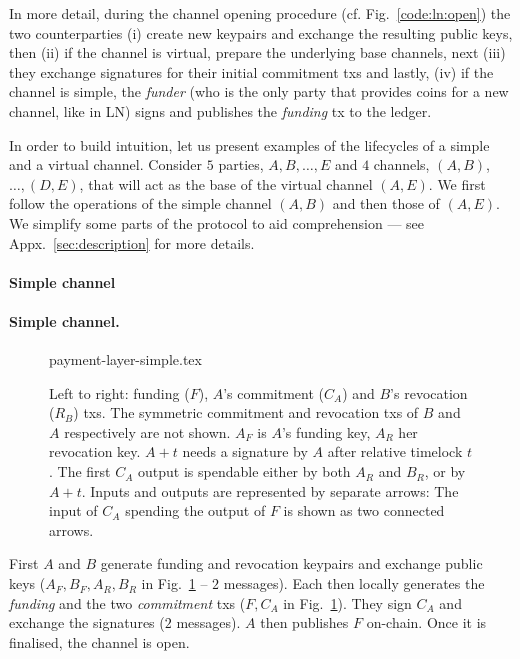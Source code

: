   In more detail, during the channel opening procedure (cf.
  Fig.~\ref{code:ln:open}) the two counterparties (i) create new keypairs and
  exchange the resulting public keys, then (ii) if the channel is
  virtual, prepare the underlying base channels, next (iii) they exchange
  signatures for their initial commitment txs
  and lastly, (iv) if the channel is simple, the \emph{funder} (who is the only
  party that provides coins for a new channel, like in LN) signs and publishes
  the \emph{funding} tx to the ledger.

  In order to build intuition, let us present examples of the
  lifecycles of a simple and a virtual channel. Consider $5$ parties, $A, B,
  \dots, E$ and $4$ channels, $(A, B)$, $\dots,(D, E)$, that will act as
  the base of the virtual channel $(A, E)$. We first follow the operations of
  the simple channel $(A, B)$ and then those of $(A, E)$. We simplify some parts
  of the protocol to aid comprehension --- see Appx.~\ref{sec:description} for
  more details.

  \makeatletter%
    {\paragraph{Simple channel}}%
    {\paragraph{Simple channel.}}%
  \makeatother%
  \addtolength{\intextsep}{-15pt}
  \begin{figure}[!htbp]
    \centering
    {payment-layer-simple.tex}
    \caption{Left to right: funding ($F$), $A$'s commitment ($C_A$) and $B$'s
    revocation ($R_B$) txs.
    The symmetric commitment and
    revocation txs of $B$ and $A$ respectively are not shown.
    $A_F$ is $A$'s funding key, $A_R$ her revocation key. $A+t$ needs a signature
    by $A$ after relative timelock $t$. The first $C_A$ output is
    spendable either by both $A_R$ and $B_R$, or by $A + t$. Inputs and outputs are
    represented by separate arrows: The input of $C_A$ spending the output of
    $F$ is shown as two connected arrows.}%
    \label{figure:payment-layer-simple}
  \end{figure}
  \addtolength{\intextsep}{15pt}

  First $A$ and $B$ generate funding and revocation keypairs and exchange
  public keys ($A_F, B_F, A_R, B_R$ in Fig.~\ref{figure:payment-layer-simple} --
  $2$ messages). Each then
  locally generates the \emph{funding} and the two \emph{commitment} txs
  ($F, C_A$ in Fig.~\ref{figure:payment-layer-simple}). They
  sign $C_A$ and exchange the
  signatures ($2$ messages). $A$ then publishes $F$ on-chain. Once it
  is finalised, the channel is open.

